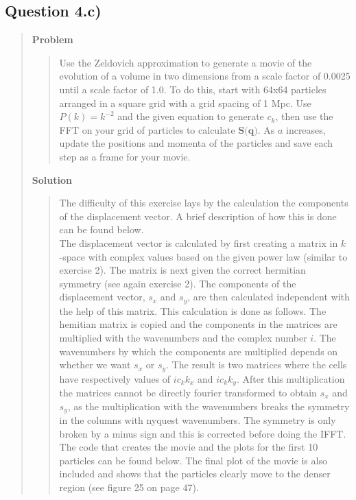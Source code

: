 
\subsection*{\textbf{Question 4.c)}}
\begin{quote}

\textbf{Problem}
\begin{quote} 
Use the Zeldovich approximation to generate a movie of the evolution of a volume in two dimensions
from a scale factor of 0.0025 until a scale factor of 1.0. To do this, start with 64x64 particles arranged in a square grid with a grid spacing of 1 Mpc. Use $P(k) = k^{-2}$ and the given equation to generate $c_k$, then use the FFT on your grid of particles to calculate $\textbf{S(q)}$. As $a$ increases, update the positions and momenta of the particles and save each step as a frame for your movie. 
\end{quote}

\textbf{Solution} 
\begin{quote}
The difficulty of this exercise lays by the calculation the components of the displacement vector. A brief description of how this is done can be found below.
\\

The displacement vector is calculated by first creating a matrix in $k$ -space with complex values based on the given power law (similar to exercise 2). The matrix is next given the correct hermitian symmetry (see again exercise 2). The components of the displacement vector, $s_x$ and $s_y$, are then calculated independent with the help of this matrix.  This calculation is done as follows. The hemitian matrix is copied and the components in the matrices are multiplied with the wavenumbers and the complex number $i$. The wavenumbers by which the components are multiplied depends on whether we want $s_x$ or $s_y$. The result is two matrices where the cells have respectively values of $ic_k k_x$ and $ic_k k_y$. After this multiplication the matrices cannot be directly fourier transformed to obtain $s_x$ and $s_y$, as the multiplication with the wavenumbers breaks the symmetry in the columns with nyquest wavenumbers. The symmetry is only broken by a minus sign and this is corrected before doing the IFFT. 
\\
The code that creates the movie and the plots for the first 10 particles can be found below. The final plot of the movie is also included and shows that the particles clearly move to the denser region (see figure 25 on page 47).


\end{quote}
\end{quote}
